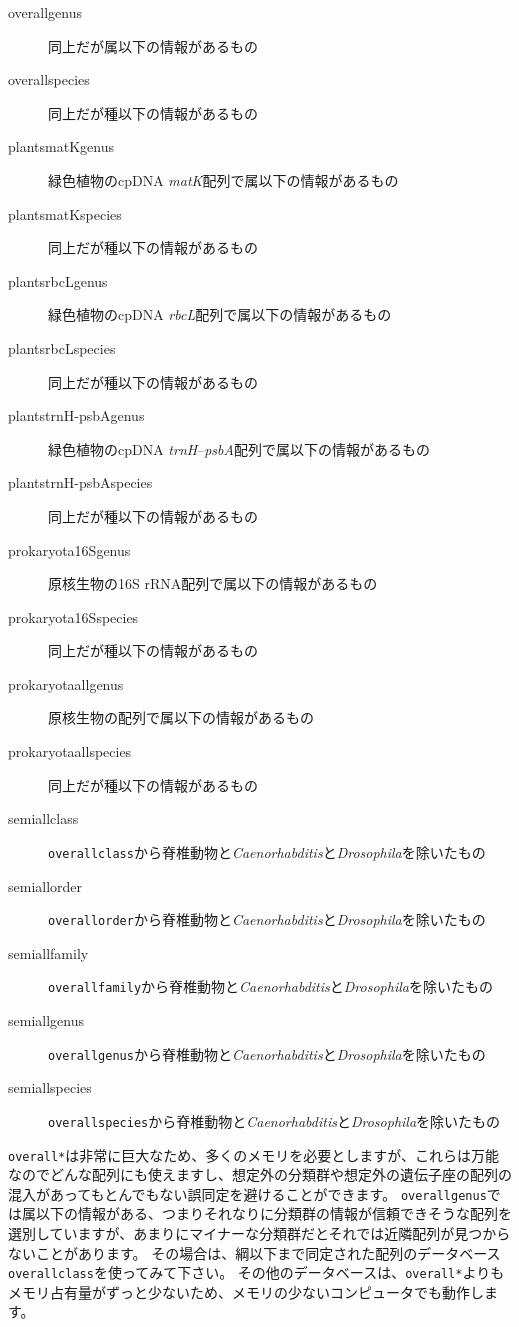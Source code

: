 \documentclass[titlepage,10pt,a4paper,english]{jsbook}
\begin{document}
\begin{description}
\item[overall{\textunderscore}genus] 同上だが属以下の情報があるもの
\item[overall{\textunderscore}species] 同上だが種以下の情報があるもの
\item[plants{\textunderscore}matK{\textunderscore}genus] 緑色植物のcpDNA \textit{matK}配列で属以下の情報があるもの
\item[plants{\textunderscore}matK{\textunderscore}species] 同上だが種以下の情報があるもの
\item[plants{\textunderscore}rbcL{\textunderscore}genus] 緑色植物のcpDNA \textit{rbcL}配列で属以下の情報があるもの
\item[plants{\textunderscore}rbcL{\textunderscore}species] 同上だが種以下の情報があるもの
\item[plants{\textunderscore}trnH-psbA{\textunderscore}genus] 緑色植物のcpDNA \textit{trnH}--\textit{psbA}配列で属以下の情報があるもの
\item[plants{\textunderscore}trnH-psbA{\textunderscore}species] 同上だが種以下の情報があるもの
\item[prokaryota{\textunderscore}16S{\textunderscore}genus] 原核生物の16S rRNA配列で属以下の情報があるもの
\item[prokaryota{\textunderscore}16S{\textunderscore}species] 同上だが種以下の情報があるもの
\item[prokaryota{\textunderscore}all{\textunderscore}genus] 原核生物の配列で属以下の情報があるもの
\item[prokaryota{\textunderscore}all{\textunderscore}species] 同上だが種以下の情報があるもの
\item[semiall{\textunderscore}class] \texttt{overall{\textunderscore}class}から脊椎動物と\textit{Caenorhabditis}と\textit{Drosophila}を除いたもの
\item[semiall{\textunderscore}order] \texttt{overall{\textunderscore}order}から脊椎動物と\textit{Caenorhabditis}と\textit{Drosophila}を除いたもの
\item[semiall{\textunderscore}family] \texttt{overall{\textunderscore}family}から脊椎動物と\textit{Caenorhabditis}と\textit{Drosophila}を除いたもの
\item[semiall{\textunderscore}genus] \texttt{overall{\textunderscore}genus}から脊椎動物と\textit{Caenorhabditis}と\textit{Drosophila}を除いたもの
\item[semiall{\textunderscore}species] \texttt{overall{\textunderscore}species}から脊椎動物と\textit{Caenorhabditis}と\textit{Drosophila}を除いたもの
\end{description}
\texttt{overall{\textunderscore}*}は非常に巨大なため、多くのメモリを必要としますが、これらは万能なのでどんな配列にも使えますし、想定外の分類群や想定外の遺伝子座の配列の混入があってもとんでもない誤同定を避けることができます。
\texttt{overall{\textunderscore}genus}では属以下の情報がある、つまりそれなりに分類群の情報が信頼できそうな配列を選別していますが、あまりにマイナーな分類群だとそれでは近隣配列が見つからないことがあります。
その場合は、綱以下まで同定された配列のデータベース\texttt{overall{\textunderscore}class}を使ってみて下さい。
その他のデータベースは、\texttt{overall{\textunderscore}*}よりもメモリ占有量がずっと少ないため、メモリの少ないコンピュータでも動作します。
\end{document}
